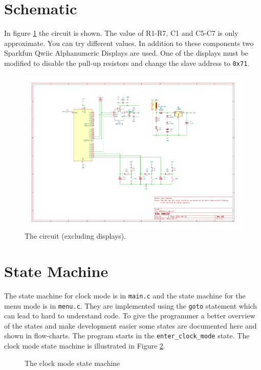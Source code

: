 \documentclass{awac02}
\begin{document}
\section{Schematic}

In figure \ref{fig:circuit} the circuit is shown. The value of R1-R7, C1 and C5-C7
is only approximate. You can try different values. In addition to these
components two Sparkfun Qwiic Alphanumeric Displays are used. One of the
displays must be modified to disable the pull-up resistors and change the slave
address to \texttt{0x71}.

\begin{figure}[h]
    \centering
    \includegraphics[width=\textwidth, trim=5cm 5cm 6cm 2cm, clip]{../Circuit}
    \caption{The circuit (excluding displays).}
    \label{fig:circuit}
\end{figure}

\section{State Machine}

The state machine for clock mode is in \texttt{main.c} and the state machine
for the menu mode is in \texttt{menu.c}. They are implemented using the
\texttt{goto} statement which can lead to hard to understand code.  To give the
programmer a better overview of the states and make development easier some
states are documented here and shown in flow-charts. The program starts in the
\texttt{enter\_clock\_mode} state. The clock mode state machine is illustrated
in Figure \ref{fig:clock-state}.

\begin{figure}[h]
    \centering
    
    \caption{The clock mode state machine}
    \label{fig:clock-state}
\end{figure}
\end{document}
